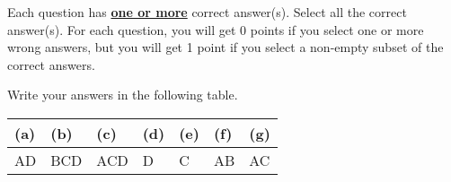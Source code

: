 
Each question has \underline{\textbf{one or more}} correct answer(s). Select all the correct answer(s). For each question, you will get 0 points if you select one or more wrong answers, but you will get 1 point if you select a non-empty subset of the correct answers.

Write your answers in the following table.


\begin{table}[htbp]
	\centering
	\begin{tabular}{|p{1.5cm}|p{1.5cm}|p{1.5cm}|p{1.5cm}|p{1.5cm}|p{1.5cm}|p{1.5cm}|}
		\hline
		(a) & (b) & (c) & (d) & (e) & (f) & (g) \\
		\hline
		  AD  &  BCD   &  ACD   &   D  &  C   &  AB   &  AC   \\
		\hline
	\end{tabular}
\end{table}

